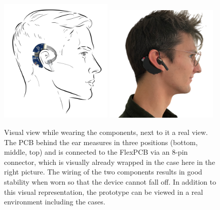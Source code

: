 \begin{figure}[t]
    \centering
    \includegraphics[width=0.48\textwidth]{thesis-doc/images/prototype/prototype_on_head_visual.png}
    \includegraphics[width=0.48\textwidth]{thesis-doc/images/prototype/Lorenz.png}
    \caption{Visual view while wearing the components, next to it a real view. The PCB behind the ear measures in three positions (bottom, middle, top) and is connected to the FlexPCB via an 8-pin connector, which is visually already wrapped in the case here in the right picture. The wiring of the two components results in good stability when worn so that the device cannot fall off. In addition to this visual representation, the prototype can be viewed in a real environment including the cases.}
    \label{fig:design:prototype_on_head_visual}
\end{figure}

